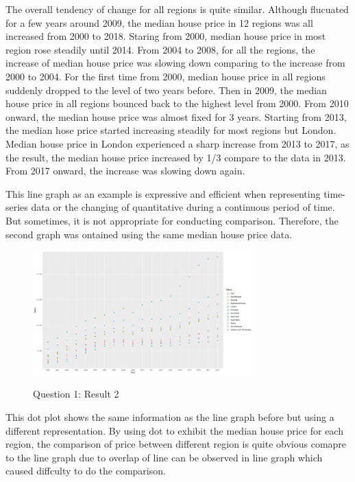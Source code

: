 \documentclass{article}
\begin{document}
The overall tendency of change for all regions is quite similar. Although flucuated for a few years around 2009, 
the median house price in 12 regions was all increased from 2000 to 2018. Staring from 2000, median house 
price in most region rose steadily until 2014. From 2004 to 2008, for all the regions, the increase of 
median house price was slowing down comparing to the increase from 2000 to 2004. For the first time from 2000, 
median house price in all regions suddenly dropped to the level of two years before. Then in 2009, the median 
house price in all regions bounced back to the highest level from 2000. From 2010 onward, the median house 
price was almost fixed for 3 years. Starting from 2013, the median hose price started increasing steadily for 
most regions but London. Median house price in London experienced a sharp increase from 2013 to 2017, 
as the result, the median house price increased by 1/3 compare to the data in 2013. From 2017 onward, 
the increase was slowing down again.

This line graph as an example is expressive and efficient when representing time-series data or the changing 
of quantitative during a continuous period of time. But sometimes, it is not appropriate for conducting 
comparison. Therefore, the second graph was ontained using the same median house price data.

\begin{figure}[htb]
  \begin{minipage}[b]{1.0\linewidth}
    \centering
    \centerline{\includegraphics[width=8.5cm]{Q1Geom_point}}
    \centerline{Question 1: Result 2}\medskip
  \end{minipage}
\end{figure}

This dot plot shows the same information as the line graph before but using a different representation. 
By using dot to exhibit the median house price for each region, the comparison of price between different 
region is quite obvious comapre to the line graph due to overlap of line can be observed in line graph 
which caused diffculty to do the comparison.
\end{document}

